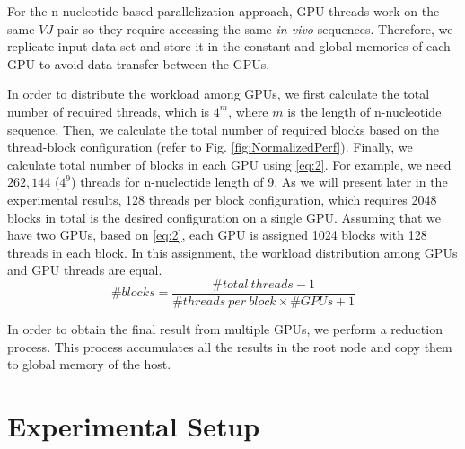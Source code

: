 For the n-nucleotide based parallelization approach, GPU threads work on the same $VJ$ pair so they require accessing the same \emph{in vivo} sequences. Therefore, we replicate input data set and store it in the constant and global memories of each GPU to avoid data transfer between the GPUs.

In order to distribute the workload among GPUs, we first calculate the total number of required threads, which is $4^m$, where $m$ is the length of n-nucleotide sequence. Then, we calculate the total number of required blocks based on the thread-block configuration (refer to Fig. \ref{fig:NormalizedPerf}). Finally, we calculate total number of blocks in each GPU using \ref{eq:2}. For example, we need $262,144$ ($4^9 $) threads for n-nucleotide length of 9. As we will present later in the experimental results, 128 threads per block configuration, which requires 2048 blocks in total  is the desired configuration on a single GPU.  Assuming that we have two GPUs, based on \ref{eq:2}, each GPU is assigned 1024 blocks with 128 threads in each block. In this assignment, the workload distribution among GPUs and GPU threads are equal. 
\begin{equation}\label{eq:2}
\# blocks = \frac{\# total~threads-1}{\# threads~per~block \times \# GPUs+1}
\end{equation}


In order to obtain the final result from multiple GPUs, we perform a reduction process. This process accumulates all the results in the root node and copy them to global memory of the host. 

\section{Experimental Setup}
\label{sec:ExptSetup}


